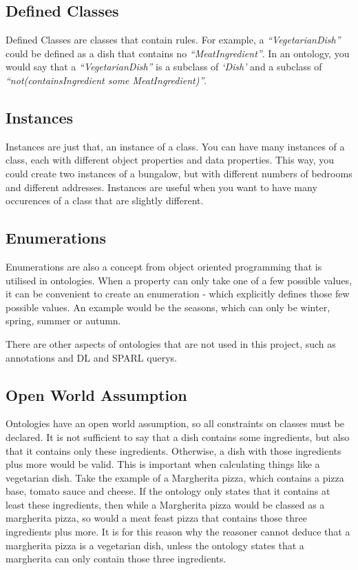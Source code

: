 \subsection{Defined Classes}

Defined Classes are classes that contain rules. For example, a \textit{``VegetarianDish''} could be defined as a dish that contains no \textit{``MeatIngredient''}. In an ontology, you would say that a \textit{``VegetarianDish''} is a subclass of \textit{`Dish'} and a subclass of \textit{``not(containsIngredient some MeatIngredient)''}.

\subsection{Instances}

Instances are just that, an instance of a class. You can have many instances of a class, each with different object properties and data properties. This way, you could create two instances of a bungalow, but with different numbers of bedrooms and different addresses. Instances are useful when you want to have many occurences of a class that are slightly different.

\subsection{Enumerations}

Enumerations are also a concept from object oriented programming that is utilised in ontologies. When a property can only take one of a few possible values, it can be convenient to create an enumeration - which explicitly defines those few possible values. An example would be the seasons, which can only be winter, spring, summer or autumn.

There are other aspects of ontologies that are not used in this project, such as annotations and DL and SPARL querys.

\subsection{Open World Assumption}

Ontologies have an open world assumption, so all constraints on classes must be declared. It is not sufficient to say that a dish contains some ingredients, but also that it contains only these ingredients. Otherwise, a dish with those ingredients plus more would be valid. This is important when calculating things like a vegetarian dish. Take the example of a Margherita pizza, which contains a pizza base, tomato sauce and cheese. If the ontology only states that it contains at least these ingredients, then while a Margherita pizza would be classed as a margherita pizza, so would a meat feast pizza that contains those three ingredients plus more. It is for this reason why the reasoner cannot deduce that a margherita pizza is a vegetarian dish, unless the ontology states that a margherita can only contain those three ingredients.


